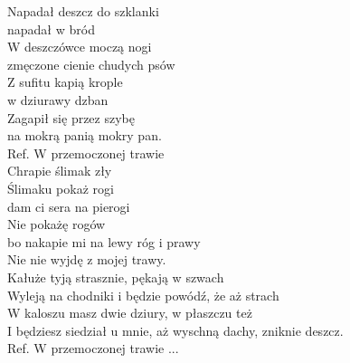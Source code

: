 
Napadał deszcz do szklanki \tab{}\\
napadał w bród  \tab{}\\
W deszczówce moczą nogi \tab{}\\
zmęczone cienie chudych psów \tab{}\\
\hops
Z sufitu kapią krople\tab{}\\
w dziurawy dzban \tab{}\\
Zagapił się przez szybę\tab{}\\
na mokrą panią mokry pan. \tab{}\\
\hops
Ref. W przemoczonej trawie \tab{}\\
 Chrapie ślimak zły \tab{}\\
 Ślimaku pokaż rogi\tab{}\\
 dam ci sera na pierogi \tab{}\\
 Nie pokażę rogów\tab{}\\
 bo nakapie mi na lewy róg i prawy \\
 Nie nie wyjdę z mojej trawy. \\
\hops
Kałuże tyją strasznie, pękają w szwach\\
Wyleją na chodniki i będzie powódź, że aż strach\\
\hops
W kaloszu masz dwie dziury, w płaszczu też\\
I będziesz siedział u mnie, aż wyschną dachy, zniknie deszcz. \\
\hops
Ref. W przemoczonej trawie ...